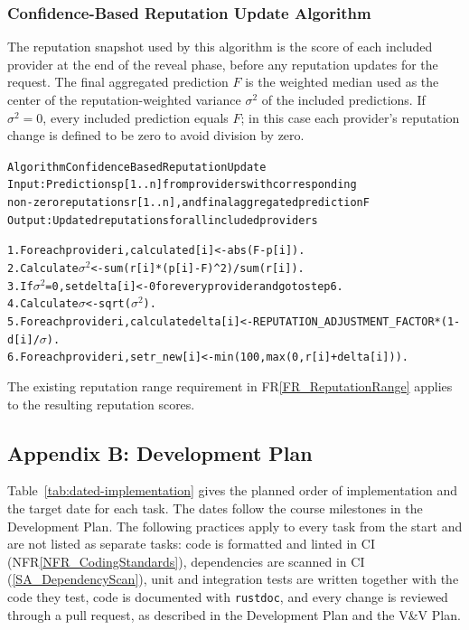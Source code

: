 \documentclass[12pt]{article}
\newcommand{\rref}[1]{FR\ref{#1}}
\newcommand{\nfrref}[1]{NFR\ref{#1}}
\begin{document}
\subsubsection{Confidence-Based Reputation Update Algorithm}
\label{App_ConfidenceBasedReputationUpdate}

The reputation snapshot used by this algorithm is the score of each included
provider at the end of the reveal phase, before any reputation updates for the
request. The final aggregated prediction $F$ is the weighted median used as
the center of the reputation-weighted variance $\sigma^2$ of the included
predictions. If $\sigma^2=0$, every included prediction equals $F$; in this case each provider's
reputation change is defined to be zero to avoid division by zero.

\begin{alltt}
Algorithm ConfidenceBasedReputationUpdate
Input:  Predictions p[1..n] from providers with corresponding
        non-zero reputations r[1..n], and final aggregated prediction F
Output: Updated reputations for all included providers

1.  For each provider i, calculate d[i] <- abs(F - p[i]).
2.  Calculate \ensuremath{\sigma^2} <- sum(r[i] * (p[i] - F)^2) / sum(r[i]).
3.  If \ensuremath{\sigma^2} = 0, set delta[i] <- 0 for every provider and go to step 6.
4.  Calculate \ensuremath{\sigma} <- sqrt(\ensuremath{\sigma^2}).
5.  For each provider i, calculate delta[i] <- REPUTATION\_ADJUSTMENT\_FACTOR * (1 - d[i] / \ensuremath{\sigma}).
6.  For each provider i, set r\_new[i] <- min(100, max(0, r[i] + delta[i])).
\end{alltt}

The existing reputation range requirement in \rref{FR_ReputationRange} applies
to the resulting reputation scores.

\subsection{Appendix B: Development Plan}

Table~\ref{tab:dated-implementation} gives the planned order of
implementation and the target date for each task. The dates follow the
course milestones in the Development Plan. The following practices apply to
every task from the start and are not listed as separate tasks: code is
formatted and linted in CI (\nfrref{NFR_CodingStandards}), dependencies are
scanned in CI (\ref{SA_DependencyScan}), unit and integration tests are
written together with the code they test, code is documented with
\texttt{rustdoc}, and every change is reviewed through a pull request, as
described in the Development Plan and the V\&V Plan.
\end{document}
